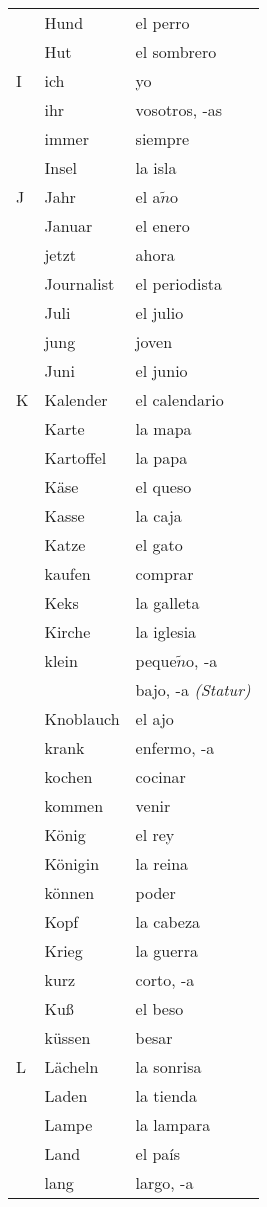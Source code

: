 \documentclass{spanish_summary}
\begin{document}
\begin{longtable}{p{} p{} | p{}}
& Hund & el perro  \\
& Hut & el sombrero  \\
I & ich & yo  \\
& ihr & vosotros, -as\\
& immer & siempre  \\
& Insel & la isla  \\
J & Jahr & el a$\tilde{n}$o \\
& Januar & el enero  \\
& jetzt & ahora \\
& Journalist & el periodista  \\
& Juli & el julio  \\
& jung & joven \\
& Juni & el junio  \\
K & Kalender & el calendario  \\
& Karte & la mapa  \\
& Kartoffel & la papa  \\
& Käse & el queso  \\
& Kasse & la caja  \\
& Katze & el gato  \\
& kaufen & comprar  \\
& Keks & la galleta  \\
& Kirche & la iglesia  \\
& klein & peque$\tilde{n}$o, -a  \\
& & bajo, -a \textit{(Statur)}\\
& Knoblauch & el ajo  \\
& krank & enfermo, -a \\
& kochen & cocinar  \\
& kommen & venir  \\
& König & el rey  \\
& Königin & la reina  \\
& können & poder  \\
& Kopf & la cabeza \\
& Krieg & la guerra  \\
& kurz & corto, -a  \\
& Kuß & el beso  \\
& küssen & besar  \\
L & Lächeln & la sonrisa  \\
& Laden & la tienda  \\
& Lampe & la lampara  \\
& Land & el país  \\
& lang & largo, -a  \\

\end{longtable}
\end{document}
